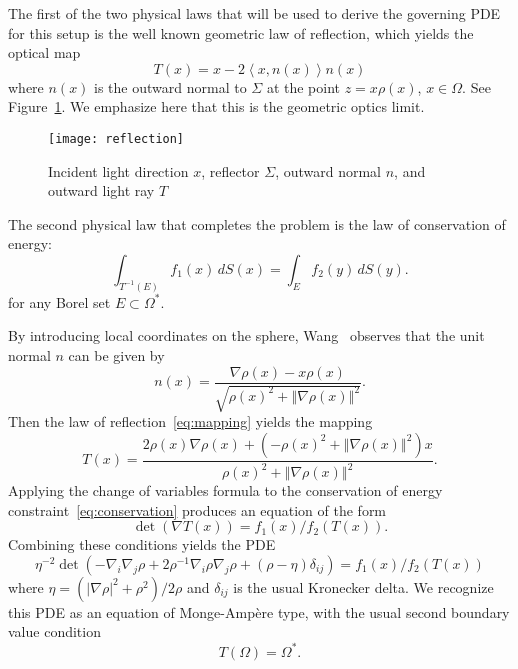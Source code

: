 \documentclass{amsart}
\newcommand{\bq}{\begin{equation}}
\newcommand{\eq}{\end{equation}}
\newcommand{\norm}[1]{\left\Vert#1\right\Vert}
\theoremstyle{lemma}
\theoremstyle{remark}
\begin{document}
The first of the two physical laws that will be used to derive the governing PDE for this setup is the well known geometric law of reflection, which yields the optical map
\begin{equation}\label{eq:mapping}
T(x) = x - 2\left\langle x, n(x) \right\rangle n(x)
\end{equation}
where $n(x)$ is the outward normal to $\Sigma$ at the point $z = x \rho(x)$, $x \in \Omega$.  See Figure~\ref{fig:reflection}.  We emphasize here that this is the geometric optics limit.

\begin{figure}[htp]
\texttt{[image: reflection]}
\caption{Incident light direction $x$, reflector $\Sigma$, outward normal $n$, and outward light ray $T$}\label{fig:reflection}
\end{figure}


The second physical law that completes the problem is the law of conservation of energy:
\begin{equation}\label{eq:conservation}
\int_{{T}^{-1}(E)} f_1(x)\,dS(x) = \int_{E} f_2(y)\,dS(y).
\end{equation}
for any Borel set $E \subset \Omega^{*}$.

By introducing local coordinates on the sphere, Wang~\cite{Wang_Reflector} observes that the unit normal $n$ can be given by
\bq\label{eq:n}
n(x) = \frac{\nabla\rho(x) - x\rho(x)}{\sqrt{\rho(x)^2+\norm{\nabla\rho(x)}^2}}.
\eq
Then the law of reflection~\eqref{eq:mapping} yields the mapping
\bq\label{eq:mapping2}
T(x) = \frac{2\rho(x)\nabla\rho(x)+\left(-\rho(x)^2+\norm{\nabla\rho(x)}^2\right)x}{\rho(x)^2+\norm{\nabla\rho(x)}^2}.
\eq
Applying the change of variables formula to the conservation of energy constraint~\eqref{eq:conservation} produces an equation of the form
\bq\label{eq:detEquation}
\det(\nabla T(x)) = f_1(x)/f_2(T(x)).
\eq
Combining these conditions yields the PDE
\begin{equation}\label{eq:opticsPDE}
\eta^{-2} \det\left( -\nabla_{i} \nabla_{j} \rho + 2 \rho^{-1} \nabla_{i} \rho \nabla_{j} \rho + (\rho - \eta)\delta_{ij} \right) = f_1(x)/f_2(T(x))
\end{equation}
where $\eta = \left( \left\vert \nabla \rho \right\vert^2 + \rho^2 \right)/2\rho$ and $\delta_{ij}$ is the usual Kronecker delta. We recognize this PDE as an equation of Monge-Amp\`{e}re type, with the usual second boundary value condition~\cite{Urbas}
\begin{equation}
T(\Omega) = \Omega^{*}.
\end{equation}
\end{document}
